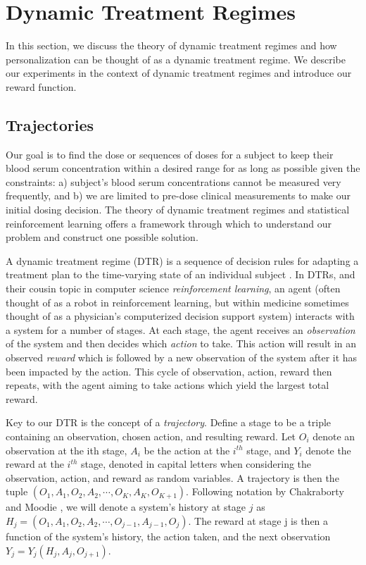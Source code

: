\section{Dynamic Treatment Regimes}



In this section, we discuss the theory of dynamic treatment regimes and how personalization can be thought of as a dynamic treatment regime.  We describe our experiments in the context of dynamic treatment regimes and introduce our reward function.

\subsection{Trajectories}

Our goal is to find the dose or sequences of doses for a subject to keep their blood serum concentration within a desired range for as long as possible given the constraints: a) subject’s blood serum concentrations cannot be measured very frequently, and b) we are limited to pre-dose clinical measurements to make our initial dosing decision.  The theory of dynamic treatment regimes and statistical reinforcement learning offers a framework through which to understand our problem and construct one possible solution.

A dynamic treatment regime (DTR) is a sequence of decision rules for adapting a treatment plan to the time-varying state of an individual subject \cite{chakraborty2013statistical}. In DTRs, and their cousin topic in computer science \textit{reinforcement learning}, an agent (often thought of as a robot in reinforcement learning, but within medicine sometimes thought of as a physician’s computerized decision support system) interacts with a system for a number of stages. At each stage, the agent receives an \textit{observation} of the system and then decides which \textit{action} to take.  This action will result in an observed \textit{reward} which is followed by a new observation of the system after it has been impacted by the action.  This cycle of observation, action, reward then repeats, with the agent aiming to take actions which yield the largest total reward.

Key to our DTR is the concept of a \textit{trajectory}. Define a stage to be a triple containing an observation, chosen action, and resulting reward. Let $O_i$ denote an observation at the ith stage, $ A_i $ be the action at the $ i^{th} $ stage, and $ Y_i $ denote the reward at the $ i^{th}$ stage, denoted in capital letters when considering the observation, action, and reward as random variables.  A  trajectory is then the tuple $ (O_1, A_1, O_2, A_2,  \cdots, O_K, A_K, O_{K+1})$.  Following notation by Chakraborty and Moodie \cite{chakraborty2013statistical}, we will denote a system’s history at stage $ j $ as $ H_j = (O_1, A_1, O_2, A_2, \cdots , O_{j-1}, A_{j-1}, O_j) $.  The reward at stage j is then a function of the system’s history, the action taken, and the next observation $ Y_j = Y_j(H_j, A_j, O_{j+1}) $.

